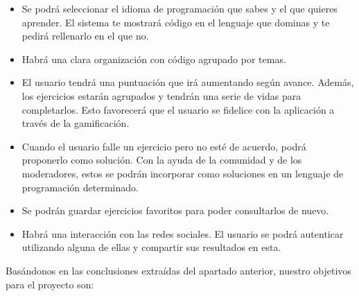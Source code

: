 \begin{itemize}
\item
Se podrá seleccionar el idioma de programación que sabes y el que quieres aprender. El sistema te mostrará código en el lenguaje que dominas y te pedirá rellenarlo en el que no.

\item
Habrá una clara organización con código agrupado por temas.

\item
El usuario tendrá una puntuación que irá aumentando según avance. Además, los ejercicios estarán agrupados y tendrán una serie de vidas para completarlos. Esto favorecerá  que el usuario se fidelice con la aplicación a través de la gamificación.

\item
Cuando el usuario falle un ejercicio pero no esté de acuerdo, podrá proponerlo como solución. Con la ayuda de la comunidad y de los moderadores, estos se podrán incorporar como soluciones en un lenguaje de programación determinado.

\item
Se podrán guardar ejercicios favoritos para poder consultarlos de nuevo.

\item
Habrá una interacción con las redes sociales. El usuario se podrá autenticar utilizando alguna de ellas y compartir sus resultados en esta.

\end{itemize}

Basándonos en las conclusiones extraídas del apartado anterior, nuestro objetivos para el proyecto son:

